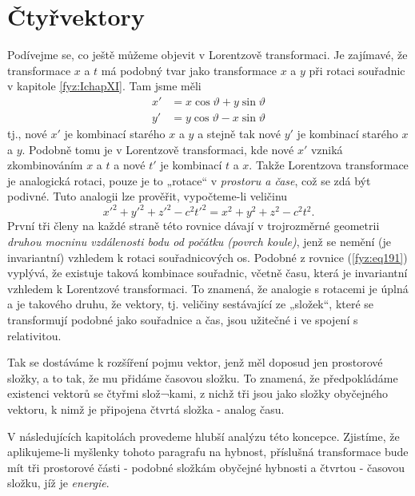   \section{Čtyřvektory}\label{fyz:IchapXVsecIX}
    Podívejme se, co ještě můžeme objevit v Lorentzově transformaci. Je zajímavé, že transformace
    \(x\) a \(t\) má podobný tvar jako transformace \(x\) a \(y\) při rotaci souřadnic v kapitole
    \ref{fyz:IchapXI}. Tam jsme měli
    \begin{align}
       x' &= x\cos\vartheta + y\sin\vartheta             \nonumber \\
       y' &= y\cos\vartheta - x\sin\vartheta             \label{fyz:eq190}
    \end{align}
    tj., nové \(x'\) je kombinací starého \(x\) a \(y\) a stejně tak nové \(y'\) je kombinací 
    starého \(x\) a \(y\). Podobně tomu je v Lorentzově transformaci, kde nové \(x'\) vzniká 
    zkombinováním \(x\) a \(t\) a nové \(t'\) je kombinací \(t\) a \(x\). Takže Lorentzova 
    transformace je analogická rotaci, pouze je to „rotace“ v \emph{prostoru a čase}, což se zdá 
    být podivné. Tuto analogii lze prověřit, vypočteme-li veličinu
    \begin{equation}\label{fyz:eq191}
      x'^2 + y'^2 + z'^2 -c^2t'^2 = x^2 + y^2 + z^2 - c^2t^2.
    \end{equation}
    První tři členy na každé straně této rovnice dávají v trojrozměrné geometrii \emph{druhou 
    mocninu vzdálenosti bodu od počátku (povrch koule)}, jenž se nemění (je invariantní) vzhledem k 
    rotaci souřadnicových os. Podobné z rovnice (\ref{fyz:eq191}) vyplývá, že existuje taková 
    kombinace souřadnic, včetně času, která je invariantní vzhledem k Lorentzové transformaci. To 
    znamená, že analogie s rotacemi je úplná a je takového druhu, že vektory, tj. veličiny 
    sestávající ze „složek“, které se transformují podobné jako souřadnice a čas, jsou užitečné i 
    ve spojení s relativitou.
    
    Tak se dostáváme k rozšíření pojmu vektor, jenž měl doposud jen prostorové složky, a to tak, že 
    mu přidáme časovou složku. To znamená, že předpokládáme existenci vektorů se čtyřmi slož¬kami, 
    z nichž tři jsou jako složky obyčejného vektoru, k nimž je připojena čtvrtá složka - analog 
    času.
    
    V následujících kapitolách provedeme hlubší analýzu této koncepce. Zjistíme, že aplikujeme-li 
    myšlenky tohoto paragrafu na hybnost, příslušná transformace bude mít tři prostorové části - 
    podobné složkám obyčejné hybnosti a čtvrtou - časovou složku, jíž je \emph{energie}.
     
